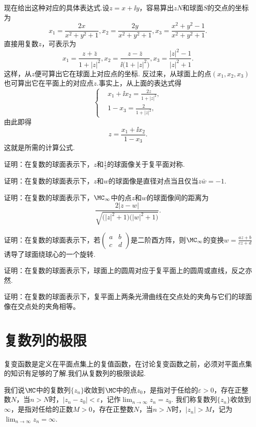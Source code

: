 现在给出这种对应的具体表达式.设$z=x+\ii y$，容易算出$zN$和球面$S$的交点的坐标为
\[x_1=\frac{2x}{x^2+y^2+1},x_2=\frac{2y}{x^2+y^2+1},x_3=\frac{x^2+y^2-1}{x^2+y^2+1}.\]
直接用复数$z$，可表示为
\[x_1=\frac{z+\bar z}{1+|z|^2},x_2=\frac{z-\bar z}{\ii\big(1+|z|^2\big)},
x_3=\frac{|z|^2-1}{|z|^2+1}.\]
这样，从$z$便可算出它在球面上对应点的坐标. 反过来，从球面上的点$(x_1,x_2,x_3)$也可算出它在平面上的对应点$z$.事实上，从上面的表达式得
\[\left\{\begin{aligned}
&x_1+\ii x_2=\frac{2z}{1+|z|^2},\\
&1-x_3=\frac2{1+|z|^2},
\end{aligned}\right.\]
由此即得
\[z=\frac{x_1+\ii x_2}{1-x_3}.\]
这就是所需的计算公式.

\begin{xiti}
  \item 证明：在复数的球面表示下，$z$和$\frac 1{\bar z}$的球面像关于复平面对称.
  \item 证明：在复数的球面表示下，$z$和$w$的球面像是直径对点当且仅当$z\bar w=-1$.
  \item 证明：在复数的球面表示下，$\MC_\infty$中的点$z$和$w$的球面像间的距离为
     \[\frac{2|z-w|}{\sqrt{\big(|z|^2+1\big)\big(|w|^2+1\big)}}.\]
  \item 证明：在复数的球面表示下，若$\begin{pmatrix}
  a&b\\c&d
  \end{pmatrix}$是二阶酉方阵，则$\MC_\infty$的变换$w=\frac{az+b}{cz+d}$诱导了球面绕球心的一个旋转.
  \item 证明：在复数的球面表示下，球面上的圆周对应于复平面上的圆周或直线，反之亦然.
  \item 证明：在复数的球面表示下，复平面上两条光滑曲线在交点处的夹角与它们的球面像在交点处的夹角相等。
\end{xiti}

\section{复数列的极限\label{sec1.4}}
复变函数是定义在平面点集上的复值函数，在讨论复变函数之前，必须对平面点集的知识有足够的了解.我们从复数列的极限谈起.

我们说$\MC$中的复数列$\{z_n\}$收敛到$\MC$中的点$z_0$，是指对于任给的$\varepsilon>0$，存在正整数$N$，当$n>N$时，$|z_n-z_0|<\varepsilon$，记作$\lim_{n\to\infty}z_n=z_0$.
我们称复数列$\{z_n\}$收敛到$\infty$，是指对任给的正数$M>0$，存在正整数$N$，当$n>N$时，$|z_n|>M$，记为$\lim_{n\to\infty}z_n=\infty$.

